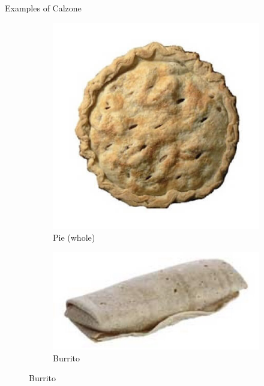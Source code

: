 \documentclass{beamer}
\begin{document}
\begin{frame}{Examples of Calzone}
    \begin{figure}
        \begin{subfigure}{.3\textwidth}
          \centering
          \includegraphics[width=.8\linewidth]{calzone/27_pie.jpg}
          \caption{\label{fig:whole-pie}Pie (whole)}
        \end{subfigure}
        \begin{subfigure}{.4\textwidth}
          \centering
          \includegraphics[width=.8\linewidth]{calzone/27_burrito.jpg}
          \caption{\label{fig:burrito}Burrito}

\end{subfigure}
\end{figure}
\end{frame}
\end{document}

